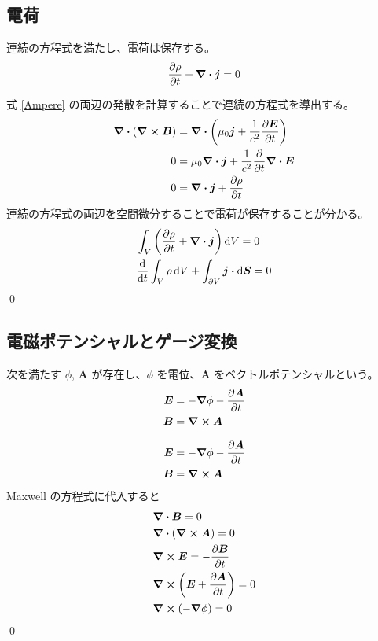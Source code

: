 \documentclass[uplatex,dvipdfmx,a4paper,11pt]{jlreq}
\makeatletter
\newcommand{\EE}{\bm{E}}
\newcommand{\BB}{\bm{B}}
\renewcommand{\AA}{\bm{A}}
\theoremstyle{definition}
\renewenvironment{proof}[1][\proofname]{\par
  \normalfont
  \topsep6\p@\@plus6\p@ \trivlist
  \item[\hskip\labelsep{\bfseries #1}\@addpunct{\bfseries}]\ignorespaces\quad\par
}{%
  \qed\endtrivlist\@endpefalse
}
\renewcommand\proofname{証明}
\makeatother
\begin{document}
\subsection{電荷}
\begin{theorem}[電荷の保存則]
  連続の方程式を満たし、電荷は保存する。
  \begin{align}
    \pdv{\rho}{t} + \vnabla\vdot\bm{j} = 0
  \end{align}
\end{theorem}
\begin{proof}
  式 \eqref{Ampere} の両辺の発散を計算することで連続の方程式を導出する。
  \begin{align}
    \vnabla\vdot(\vnabla\cross\BB) & = \vnabla\vdot\qty(\mu_0\bm{j} + \frac{1}{c^2}\pdv{\EE}{t})     \\
    0                              & = \mu_0\vnabla\vdot\bm{j} + \frac{1}{c^2}\pdv{t}\vnabla\vdot\EE \\
    0                              & = \vnabla\vdot\bm{j} + \pdv{\rho}{t}
  \end{align}
  連続の方程式の両辺を空間微分することで電荷が保存することが分かる。
  \begin{align}
     & \int_V\qty(\pdv{\rho}{t} + \vnabla\vdot\bm{j})\dd{V} = 0             \\
     & \dv{t}\int_V\rho\dd{V} + \int_{\partial V}\bm{j}\vdot\dd{\bm{S}} = 0
  \end{align}
\end{proof}


\subsection{電磁ポテンシャルとゲージ変換}
\begin{theorem}[電位とベクトルポテンシャル]
  次を満たす $\phi$, $\AA$ が存在し、$\phi$ を電位、$\AA$ をベクトルポテンシャルという。
  \begin{align}
    \EE & = - \vnabla\phi - \pdv{\AA}{t} \\
    \BB & = \vnabla\cross\AA
  \end{align}
\end{theorem}
\begin{proof}
  \begin{align}
    \EE & = - \vnabla\phi - \pdv{\AA}{t} \\
    \BB & = \vnabla\cross\AA
  \end{align}
  Maxwell の方程式に代入すると
  \begin{align}
     & \vnabla\vdot\BB = 0                       \\
     & \vnabla\vdot(\vnabla\cross\AA) = 0        \\
     & \vnabla\cross\EE = -\pdv{\BB}{t}          \\
     & \vnabla\cross\qty(\EE + \pdv{\AA}{t}) = 0 \\
     & \vnabla\cross\qty(-\vnabla\phi) = 0
  \end{align}
\end{proof}
\end{document}

